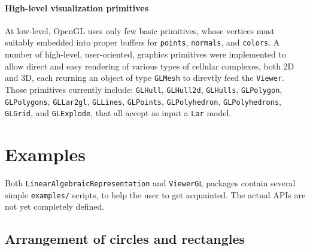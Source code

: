 \documentclass{juliacon}
\begin{document}
\paragraph*{High-level visualization primitives}
At low-level, OpenGL uses only few basic primitives, whose vertices must suitably embedded into proper buffers for \texttt{points}, \texttt{normals}, and \texttt{colors}. 
A number of high-level, user-oriented, graphics primitives were implemented to allow direct and easy rendering of various types of cellular complexes, both 2D and 3D, each reurning an object of type \texttt{GLMesh} to direvtly feed the \texttt{Viewer}. Those primitives currently include:  
\texttt{GLHull}, \texttt{GLHull2d}, \texttt{GLHulls}, \texttt{GLPolygon}, \texttt{GLPolygons}, \texttt{GLLar2gl}, \texttt{GLLines}, \texttt{GLPoints}, \texttt{GLPolyhedron}, \texttt{GLPolyhedrons}, \texttt{GLGrid}, and \texttt{GLExplode}, that all accept as input a \texttt{\texttt{Lar}} model.


\section{Examples}

Both \texttt{LinearAlgebraicRepresentation} and \texttt{ViewerGL} packages contain several simple \texttt{examples/} scripts, to help the user to get acquainted. The actual APIs are not yet completely defined.


\subsection{Arrangement of circles and rectangles}
\end{document}
